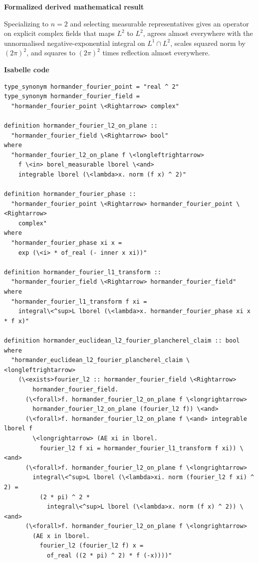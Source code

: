 \documentclass[10pt,oneside]{article}
\newcommand{\reviewlabel}[1]{\par\smallskip\noindent\textsf{\bfseries #1}\par\smallskip}
\begin{document}
\reviewlabel{Formalized derived mathematical result}
Specializing to $n=2$ and selecting measurable representatives gives an operator on explicit complex fields that maps $L^2$ to $L^2$, agrees almost everywhere with the unnormalised negative-exponential integral on $L^1\cap L^2$, scales squared norm by $(2\pi)^2$, and squares to $(2\pi)^2$ times reflection almost everywhere.

\reviewlabel{Isabelle code}
\begin{lstlisting}
type_synonym hormander_fourier_point = "real ^ 2"
type_synonym hormander_fourier_field =
  "hormander_fourier_point \<Rightarrow> complex"

definition hormander_fourier_l2_on_plane ::
  "hormander_fourier_field \<Rightarrow> bool"
where
  "hormander_fourier_l2_on_plane f \<longleftrightarrow>
    f \<in> borel_measurable lborel \<and>
    integrable lborel (\<lambda>x. norm (f x) ^ 2)"

definition hormander_fourier_phase ::
  "hormander_fourier_point \<Rightarrow> hormander_fourier_point \<Rightarrow>
    complex"
where
  "hormander_fourier_phase xi x =
    exp (\<i> * of_real (- inner x xi))"

definition hormander_fourier_l1_transform ::
  "hormander_fourier_field \<Rightarrow> hormander_fourier_field"
where
  "hormander_fourier_l1_transform f xi =
    integral\<^sup>L lborel (\<lambda>x. hormander_fourier_phase xi x * f x)"

definition hormander_euclidean_l2_fourier_plancherel_claim :: bool
where
  "hormander_euclidean_l2_fourier_plancherel_claim \<longleftrightarrow>
    (\<exists>fourier_l2 :: hormander_fourier_field \<Rightarrow>
        hormander_fourier_field.
      (\<forall>f. hormander_fourier_l2_on_plane f \<longrightarrow>
        hormander_fourier_l2_on_plane (fourier_l2 f)) \<and>
      (\<forall>f. hormander_fourier_l2_on_plane f \<and> integrable lborel f
        \<longrightarrow> (AE xi in lborel.
          fourier_l2 f xi = hormander_fourier_l1_transform f xi)) \<and>
      (\<forall>f. hormander_fourier_l2_on_plane f \<longrightarrow>
        integral\<^sup>L lborel (\<lambda>xi. norm (fourier_l2 f xi) ^ 2) =
          (2 * pi) ^ 2 *
            integral\<^sup>L lborel (\<lambda>x. norm (f x) ^ 2)) \<and>
      (\<forall>f. hormander_fourier_l2_on_plane f \<longrightarrow>
        (AE x in lborel.
          fourier_l2 (fourier_l2 f) x =
            of_real ((2 * pi) ^ 2) * f (-x))))"
\end{lstlisting}
\end{document}

